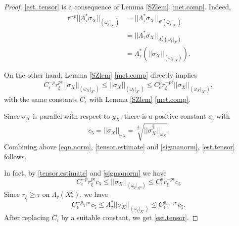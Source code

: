 \documentclass[12pt,a4paper]{amsart}
\theoremstyle{remark}
\theoremstyle{definition}
\begin{document}
\begin{proof}
\eqref{est..tensor} is a consequence of 
Lemma \ref{SZlem} \eqref{met.comp}. Indeed, 
\begin{align}
\tau^{-p}||\Lambda_\tau^*\sigma_X||_{(\omega_{\xi}|_{X_\tau})}
&=||\Lambda_\tau^* \sigma_X||_{\tau^2 (\omega_\xi|_{X_\tau})}\\ 
&=||\Lambda_\tau^* \sigma_X||_{\Lambda_\tau^* (\omega_\xi|_{X})}\\
&=\Lambda_\tau^* (||\sigma_X||_{(\omega_\xi|_X)}). \label{eqn.norm} 
\end{align}

On the other hand, Lemma \ref{SZlem} \eqref{met.comp} directly implies 
\begin{align}\label{tensor.estimate}
C_\epsilon^{-p} 
r_\xi^{p\epsilon}||\sigma_X||_{(\omega_X|_{X^o})}\le ||\sigma_X||_{(\omega_\xi|_{X^o})}\le 
C_\epsilon^p r_\xi^{-p\epsilon}||\sigma_X||_{(\omega_X|_{X^o})}, 
\end{align}
with the same constants $C_\epsilon$ with Lemma 
\ref{SZlem} \eqref{met.comp}. 

Since $\sigma_X$ is parallel with respect to $g_X$, 
there is a positive constant 
$c_5$ with 
\begin{align}\label{sigmanorm}
c_5=||\sigma_X||_{\omega_X}=\sqrt[\frac{n}{p}]{||\sigma_X^{\frac{n}{p}}||_{\omega_X}}. 
\end{align}
Combining above \eqref{eqn.norm}, \eqref{tensor.estimate} 
and \eqref{sigmanorm}, \eqref{est.tensor} follows.

In fact, by 
\eqref{tensor.estimate} 
and \eqref{sigmanorm} we have 
$$C_\epsilon^{-p}r_{\xi}^{p\epsilon}c_5 
\le ||\sigma_X||_{(\omega_\xi|_{X^o})}\le 
C_\epsilon^p r_\xi^{-p\epsilon}c_5
$$
Since  
${r_{\xi}} \geq \tau$ on 
$\Lambda_{\tau}(X_{\tau}^o)$, we have 
$$C_\epsilon^{-p}\tau^{p\epsilon}c_5 
\le \Lambda_{\tau}^*||\sigma_X||_{(\omega_\xi|_{X^o})}\le 
C_\epsilon^p \tau^{-p\epsilon}c_5. 
$$
After replacing $C_{\epsilon}$ by a suitable constant, we get \eqref{est.tensor}. 

\vspace{3mm}


\end{proof}
\end{document}
